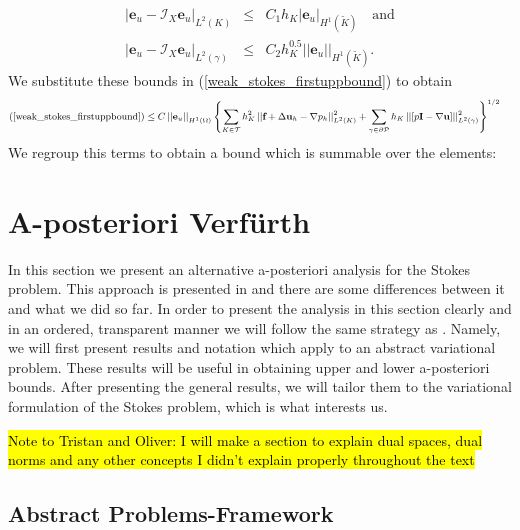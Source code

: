 \documentclass[12pt,a4paper]{article}
\theoremstyle{definition}
\begin{document}
\begin{eqnarray}
	\left|\textbf{e}_u-\mathcal{I}_X\textbf{e}_u\right|_{L^2\left(K\right)} &\leq & C_1h_K\left|\textbf{e}_u\right|_{H^1\left(\widetilde{K}\right)}\quad\text{and}\\
	\left|\textbf{e}_u-\mathcal{I}_X\textbf{e}_u\right|_{L^2\left(\gamma\right)} &\leq &C_2h_K^{0.5}\left|\left|\textbf{e}_u\right|\right|_{H^1\left(\widetilde{K}\right)}.
\end{eqnarray}
We substitute these bounds in (\ref{weak_stokes_firstuppbound}) to obtain
\begin{equation}\small
\begin{aligned}
\text{(\ref{weak_stokes_firstuppbound})}&\leq C\left|\left|\textbf{e}_u\right|\right|_{H^1\left(\Omega\right)}\left\{\sum_{K\in\mathcal{T}}h_K^2\left|\left|\textbf{f}+\Delta \textbf{u}_h-\nabla p_h\right|\right|^2_{L^2\left(K\right)} +\sum_{\gamma\in \partial \mathcal{P}}h_K\left|\left|\left[p\textbf{I}-\nabla\textbf{u}\right]\right|\right|_{L^2\left(\gamma\right)}^2\right\}^{1/2}
\end{aligned}
\end{equation}
We regroup this terms to obtain a bound which is summable over the elements:


\section{A-posteriori Verf{\"u}rth}
In this section we present an alternative a-posteriori analysis for the Stokes problem.  This approach is presented in \cite{verfurth2013posteriori} and there are some differences between it and what we did so far.  In order to present the analysis in this section clearly and in an ordered, transparent manner we will follow the same strategy as \cite{verfurth2013posteriori}. Namely,  we will first present results and notation which apply to an abstract variational problem.  These results will be useful in obtaining upper and lower a-posteriori bounds.  After presenting the general results, we will tailor them to the variational formulation of the Stokes problem, which is what interests us. 

\hl{Note to Tristan and Oliver:  I will make a section to explain dual spaces, dual norms and any other concepts I didn't explain properly throughout the text}
\subsection{Abstract Problems-Framework}\label{sec_abst_var_prob}
\end{document}
